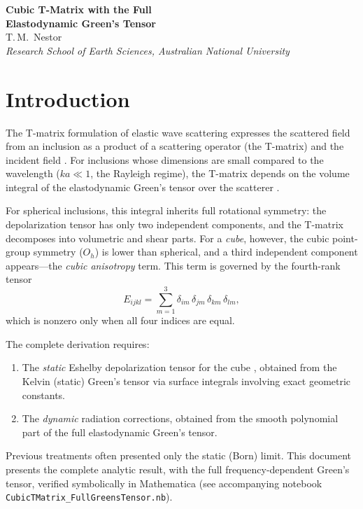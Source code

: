 \documentclass[11pt,a4paper]{article}
\begin{document}
\thispagestyle{plain}
\begin{center}
\vspace*{1em}
{\LARGE\bfseries Cubic T-Matrix with the Full\\[0.3em]
Elastodynamic Green's Tensor}\\[1.8em]
{\large T.\,M.\ Nestor}\\[0.5em]
{\itshape Research School of Earth Sciences, Australian National University}\\[2em]
\end{center}

\section{Introduction}

The T-matrix formulation of elastic wave scattering expresses the
scattered field from an inclusion as a product of a scattering
operator (the T-matrix) and the incident field
\citep{GubernatisDomanyKrumhansl1977}. For inclusions whose
dimensions are small compared to the wavelength ($ka \ll 1$, the
Rayleigh regime), the T-matrix depends on the volume integral of
the elastodynamic Green's tensor over the scatterer
\citep{Nestor1996}.

For spherical inclusions, this integral inherits full rotational
symmetry: the depolarization tensor has only two independent
components, and the T-matrix decomposes into volumetric and shear
parts. For a \emph{cube}, however, the cubic point-group symmetry
($O_h$) is lower than spherical, and a third independent component
appears---the \emph{cubic anisotropy} term. This term is governed
by the fourth-rank tensor
\begin{equation}
  E_{ijkl} = \sum_{m=1}^{3}
    \delta_{im}\,\delta_{jm}\,\delta_{km}\,\delta_{lm},
  \label{eq:Etensor}
\end{equation}
which is nonzero only when all four indices are equal.

The complete derivation requires:
\begin{enumerate}
  \item The \emph{static} Eshelby depolarization tensor for the
    cube \citep{Eshelby1957}, obtained from the Kelvin (static)
    Green's tensor via surface integrals involving exact geometric
    constants.
  \item The \emph{dynamic} radiation corrections, obtained from the
    smooth polynomial part of the full elastodynamic Green's tensor.
\end{enumerate}
Previous treatments \citep{Nestor1996,GubernatisDomanyKrumhansl1977b}
often presented only the static (Born) limit. This document
presents the complete analytic result, with the full
frequency-dependent Green's tensor, verified symbolically in
Mathematica (see accompanying notebook
\texttt{CubicTMatrix\_FullGreensTensor.nb}).
\end{document}
